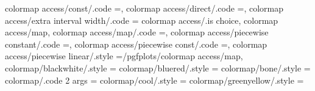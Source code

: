 colormap access/const/.code                                        ={\def\pgfplots@colormap@access{c}},                                                                                               
colormap access/direct/.code                                       ={\def\pgfplots@colormap@access{d}},                                                                                               
colormap access/extra interval width/.code                         ={                                                                                                                                 
colormap access/.is choice,
colormap access/map,
colormap access/map/.code                                          ={\def\pgfplots@colormap@access{m}},                                                                                               
colormap access/piecewise constant/.code                           ={\def\pgfplots@colormap@access{c}},                                                                                               
colormap access/piecewise const/.code                              ={\def\pgfplots@colormap@access{c}},                                                                                               
colormap access/piecewise linear/.style                            ={/pgfplots/colormap access/map},                                                                                                   
colormap/blackwhite/.style                                         ={                                                                                                                                  
colormap/bluered/.style                                            ={                                                                                                                                  
colormap/bone/.style                                               ={                                                                                                                                  
colormap/.code 2 args                                              ={                                                                                                                                 
colormap/cool/.style                                               ={                                                                                                                                  
colormap/greenyellow/.style                                        ={                                                                                                                                  
}}}}}}}
